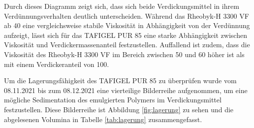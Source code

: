 \FloatBarrier 
Durch dieses Diagramm zeigt sich, dass sich beide Verdickungsmittel in ihrem Verdünnungsverhalten deutlich unterscheiden. Während das Rheobyk-H 3300 VF ab \SI{40}{\mpercent} eine vergleichsweise stabile Viskosität in Abhängigkeit von der Verdünnung aufzeigt, lässt sich für das TAFIGEL PUR 85 eine starke Abhängigkeit zwischen Viskosität und Verdickermassenanteil festzustellen. Auffallend ist zudem, dass die Viskosität des Rheobyk-H 3300 VF im Bereich zwischen 50 und \SI{60}{\mpercent} höher ist als mit einem Verdickeranteil von \SI{100}{\mpercent}.\linebreak
%
%
%

Um die Lagerungsfähigkeit des TAFIGEL PUR 85 zu überprüfen wurde vom 08.11.2021 bis zum 08.12.2021 eine vierteilige Bilderreihe aufgenommen, um eine mögliche Sedimentation des emulgierten Polymers im Verdickungsmittel festzustellen. Diese Bilderreihe ist Abbildung \ref{fig:lagerung} zu sehen und die abgelesenen Volumina in Tabelle \ref{tab:lagerung} zusammengefasst.



